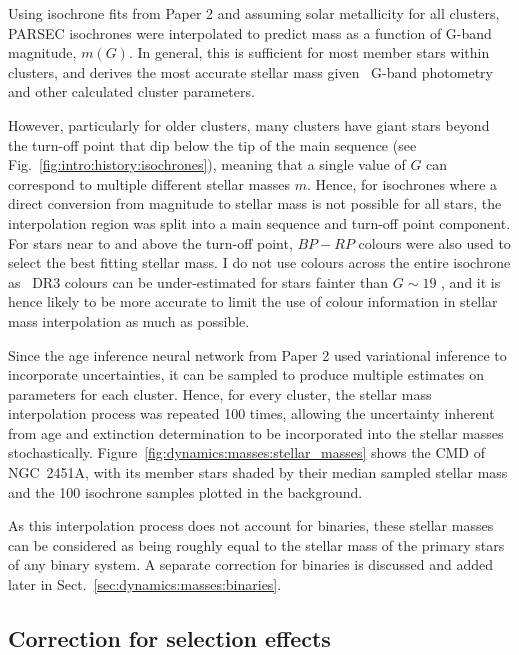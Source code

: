 Using isochrone fits from Paper 2 and assuming solar metallicity for all clusters, PARSEC isochrones \citep{bressan_parsec_2012} were interpolated to predict mass as a function of G-band magnitude, $m(G)$. In general, this is sufficient for most member stars within clusters, and derives the most accurate stellar mass given \gaia\ G-band photometry and other calculated cluster parameters. 
 
However, particularly for older clusters, many clusters have giant stars beyond the turn-off point that dip below the tip of the main sequence (see Fig.~\ref{fig:intro:history:isochrones}), meaning that a single value of $G$ can correspond to multiple different stellar masses $m$. Hence, for isochrones where a direct conversion from magnitude to stellar mass is not possible for all stars, the interpolation region was split into a main sequence and turn-off point component. For stars near to and above the turn-off point, $BP-RP$ colours were also used to select the best fitting stellar mass. I do not use colours across the entire isochrone as \gaia\ DR3 colours can be under-estimated for stars fainter than $G\sim19$ \citep[especially in the BP band,][]{riello_gaia_2021}, and it is hence likely to be more accurate to limit the use of colour information in stellar mass interpolation as much as possible.

Since the age inference neural network from Paper 2 used variational inference to incorporate uncertainties, it can be sampled to produce multiple estimates on parameters for each cluster. Hence, for every cluster, the stellar mass interpolation process was repeated 100 times, allowing the uncertainty inherent from age and extinction determination to be incorporated into the stellar masses stochastically. Figure~\ref{fig:dynamics:masses:stellar_masses} shows the CMD of NGC~2451A, with its member stars shaded by their median sampled stellar mass and the 100 isochrone samples plotted in the background.

As this interpolation process does not account for binaries, these stellar masses can be considered as being roughly equal to the stellar mass of the primary stars of any binary system. A separate correction for binaries is discussed and added later in Sect.~\ref{sec:dynamics:masses:binaries}.


\subsection{Correction for selection effects}
\label{sec:dynamics:masses:selection}


